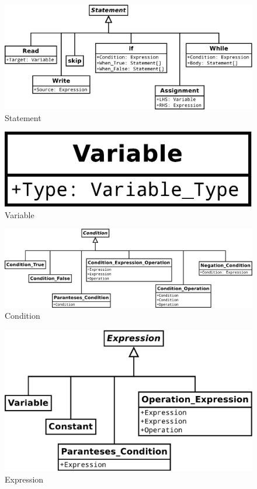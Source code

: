 \begin{figure}[h]
	\centering
	\includegraphics[scale=.3]{../fig/Statement}
	\caption{Statement}
	\label{fig:statement}
\end{figure}

\begin{figure}[h]
	\centering
	\includegraphics[scale=.3]{../fig/Variable}
	\caption{Variable}
	\label{fig:variable}
\end{figure}

\begin{figure}[h]
	\centering
	\includegraphics[scale=.3]{../fig/Condition}
	\caption{Condition}
	\label{fig:condition}
\end{figure}

\begin{figure}[h]
	\centering
	\includegraphics[scale=.3]{../fig/Expression}
	\caption{Expression}
	\label{fig:expression}
\end{figure}

